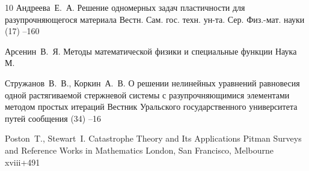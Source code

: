 \begin{thebibliography}{10}
\by Андреева~Е.~А.
\paper Решение одномерных задач пластичности для разупрочняющегося материала
\jour Вестн. Сам. гос. техн. ун-та. Сер. Физ.-мат. науки
(17)
--160



\by Арсенин~В.~Я.
\book Методы математической физики и специальные функции
\publ Наука
\publaddr М.

\by Стружанов~В.~В., Коркин~А.~В.
\paper О решении нелинейных уравнений равновесия  одной растягиваемой стержневой системы с разупрочняющимися элементами методом простых итераций
\jour Вестник Уральского государственного университета путей сообщения
(34)
--16
%

\by Poston~T., Stewart~I.
\book Catastrophe Theory and Its Applications
\publ Pitman
\serial Surveys and Reference Works in Mathematics
\publaddr London, San Francisco, Melbourne
\totalpages xviii+491 


\end{thebibliography}
